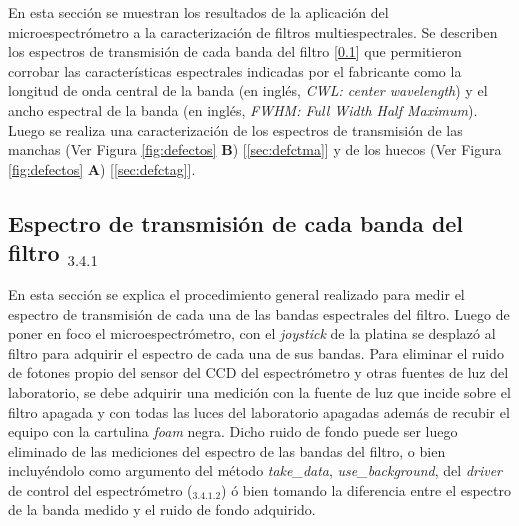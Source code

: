 \hspace{0.5cm} En esta sección se muestran los resultados de la aplicación del microespectrómetro a la caracterización de filtros multiespectrales. Se describen los espectros de transmisión de cada banda del filtro [\ref{sec:espectransm}] que permitieron corrobar las características espectrales indicadas por el fabricante como la longitud de onda central de la banda (en inglés, \textit{CWL: center wavelength}) y el ancho espectral de la banda (en inglés, \textit{FWHM: Full Width Half Maximum}). Luego se realiza una caracterización de los espectros de transmisión de las manchas (Ver Figura \ref{fig:defectos} \textbf{B}) [\ref{sec:defctma}] y de los huecos (Ver Figura \ref{fig:defectos} \textbf{A}) [\ref{sec:defctag}].


\singlespacing
\subsection{Espectro de transmisión de cada banda del filtro \href{https://github.com/jrr1984/open_frame_XYStage/blob/master/plot_spectrum_bands/plot_spectrum_bands.py}{\faGithub$_{3.4.1}$}}
\label{sec:espectransm}

\hspace{0.5cm}En esta sección se explica el procedimiento general realizado para medir el espectro de transmisión de cada una de las bandas espectrales del filtro. Luego de poner en foco el microespectrómetro, con el \textit{joystick} de la platina se desplazó al filtro para adquirir el espectro de cada una de sus bandas. Para eliminar el ruido de fotones propio del sensor del CCD del espectrómetro y otras fuentes de luz del laboratorio, se debe adquirir una medición con la fuente de luz que incide sobre el filtro apagada y con todas las luces del laboratorio apagadas además de recubir el equipo con la cartulina \textit{foam} negra. Dicho ruido de fondo puede ser luego eliminado de las mediciones del espectro de las bandas del filtro, o bien incluyéndolo como argumento del método \textit{take\_data}, \textit{use\_background}, del \textit{driver} de control del espectrómetro (\href{https://github.com/jrr1984/open\_frame\_XYStage/blob/master/XYStageAndSpec.py}{\faGithub$_{3.4.1.2}$}) ó bien tomando la diferencia entre el espectro de la banda medido y el ruido de fondo adquirido.

